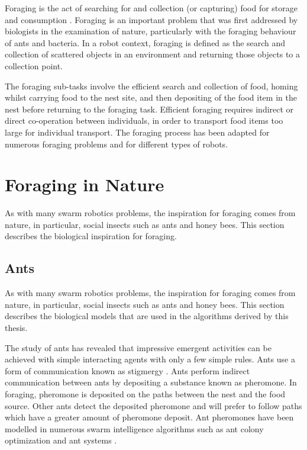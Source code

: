 Foraging is the act of searching for and collection (or capturing) food for storage and consumption \cite{winfield2009foraging}. Foraging is an important problem that was first addressed by biologists in the examination of nature, particularly with the foraging behaviour of ants and bacteria. In a robot context, foraging is defined as the search and collection of scattered objects in an environment and returning those objects to a collection point.

The foraging sub-tasks involve the efficient search and collection of food, homing whilst carrying food to the nest site, and then depositing of the food item in the nest before returning to the foraging task. Efficient foraging requires indirect or direct co-operation between individuals, in order to transport food items too large for individual transport. The foraging process has been adapted for numerous foraging problems and for different types of robots.


\section{Foraging in Nature}
\label{foraginginnature}
As with many swarm robotics problems, the inspiration for foraging comes from nature, in particular, social insects such as ants and honey bees. This section describes the biological inspiration for foraging.


\subsection{Ants}
\label{biological:ants}
As with many swarm robotics problems, the inspiration for foraging comes from nature, in particular, social insects such as ants and honey bees. This section describes the biological models that are used in the algorithms derived by this thesis. 

The study of ants has revealed that impressive emergent activities can be achieved with simple interacting agents with only a few simple rules. Ants use a form of communication known as stigmergy \cite{dorigo2000ant}. Ants perform indirect communication between ants by depositing a substance known as pheromone. In foraging, pheromone is deposited on the paths between the nest and the food source. Other ants detect the deposited pheromone and will prefer to follow paths which have a greater amount of pheromone deposit. Ant pheromones have been modelled in numerous swarm intelligence algorithms such as ant colony optimization and ant systems \cite{dorigo2006ant, dorigo2010ant}. 
 
